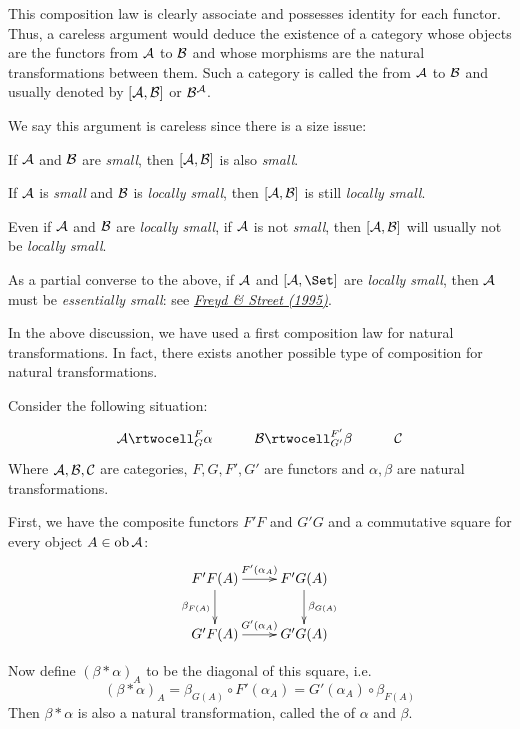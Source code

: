   This composition law is clearly associate and possesses identity for each functor.
  Thus, a careless argument would deduce the existence of a category whose objects are the functors from ${\cal A}$ to ${\cal B}$ and whose morphisms are the natural transformations between them. Such a category is called the  from ${\cal A}$ to ${\cal B}$ and usually denoted by $[{\cal A},{\cal B}]$ or ${\cal B}^{{\cal A}}$. 
  \begin{rem}
    We say this argument is careless since there is a size issue:

    If ${\cal A}$ and ${\cal B}$ are \emph{small}, then $[{\cal A},{\cal B}]$ is also \emph{small}.

    If ${\cal A}$ is \emph{small} and ${\cal B}$ is \emph{locally small}, then $[{\cal A},{\cal B}]$ is still \emph{locally small}.

    Even if ${\cal A}$ and ${\cal B}$ are \emph{locally small}, if ${\cal A}$ is not \emph{small}, then $[{\cal A},{\cal B}]$ will usually not be \emph{locally small}.

    As a partial converse to the above, if ${\cal A}$ and $[\Aa,\Set]$ are \emph{locally small}, then ${\cal A}$ must be \emph{essentially small}: see \href{http://tac.mta.ca/tac/volumes/1995/n9/1-09abs.html}{\emph{Freyd \& Street (1995)}}.
  \end{rem}

  In the above discussion, we have used a first composition law for natural transformations.
  In fact, there exists another possible type of composition for natural transformations.

  \begin{prop}
    Consider the following situation:
      \begin{displaymath}
        \xymatrix{
           \Aa\rtwocell^{F}_{G}{\alpha} &\Bb\rtwocell^{F'}_{G'}{\beta} & \Cc
        }
      \end{displaymath}
    Where ${\cal A},{\cal B},{\cal C}$ are categories, $F,G,F',G'$ are functors and $\alpha,\beta$ are natural transformations.

    First, we have the composite functors $F'F$ and $G'G$ and a commutative square for every object $A\in\operatorname{ob}{\cal A}$:
     \begin{displaymath}
        \xymatrix{
           F'F(A)\ar[r]^{F'(\alpha_A)}\ar[d]_{\beta_{F(A)}} & F'G(A)\ar[d]^{\beta_{G(A)}}\\
           G'F(A)\ar[r]^{G'(\alpha_A)} & G'G(A)
        }
    \end{displaymath}

    Now define $(\beta\ast\alpha)_A$ to be the diagonal of this square, i.e.
    \begin{equation*}
      (\beta\ast\alpha)_A = \beta_{G(A)}\circ F'(\alpha_A) = G'(\alpha_A)\circ\beta_{F(A)}
    \end{equation*}
    Then $\beta\ast\alpha$ is also a natural transformation, called the  of $\alpha$ and $\beta$. 
  \end{prop}

